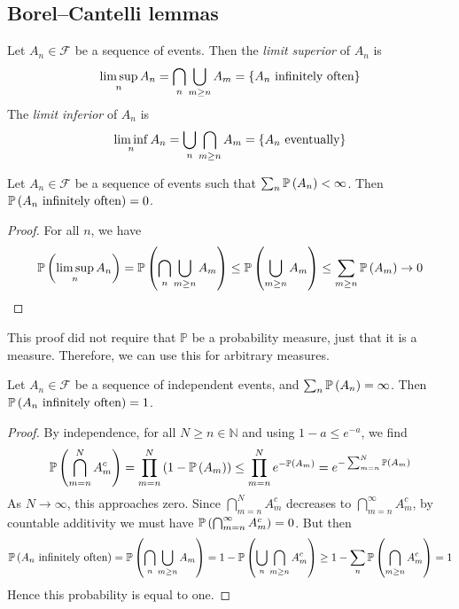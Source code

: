 \subsection{Borel--Cantelli lemmas}
\begin{definition}
	Let \( A_n \in \mathcal F \) be a sequence of events.
	Then the \emph{limit superior} of \( A_n \) is
	\[ \limsup_n A_n = \bigcap_n \bigcup_{m \geq n} A_m = \qty{A_n \text{ infinitely often}} \]
	The \emph{limit inferior} of \( A_n \) is
	\[ \liminf_n A_n = \bigcup_n \bigcap_{m \geq n} A_m = \qty{A_n \text{ eventually}} \]
\end{definition}
\begin{lemma}
	Let \( A_n \in \mathcal F \) be a sequence of events such that \( \sum_n \mathbb{P}\left({A_n}\right) < \infty \).
	Then \( \mathbb{P}\left({A_n \text{ infinitely often}}\right) = 0 \).
\end{lemma}
\begin{proof}
	For all \( n \), we have
	\[ \mathbb{P}\left({\limsup_n A_n}\right) = \mathbb{P}\left({\bigcap_n \bigcup_{m \geq n} A_m}\right) \leq \mathbb{P}\left({\bigcup_{m \geq n} A_m}\right) \leq \sum_{m \geq n} \mathbb{P}\left({A_m}\right) \to 0 \]
\end{proof}
This proof did not require that \( \mathbb P \) be a probability measure, just that it is a measure.
Therefore, we can use this for arbitrary measures.
\begin{lemma}
	Let \( A_n \in \mathcal F \) be a sequence of independent events, and \( \sum_n \mathbb{P}\left({A_n}\right) = \infty \).
	Then \( \mathbb{P}\left({A_n \text{ infinitely often}}\right) = 1 \).
\end{lemma}
\begin{proof}
	By independence, for all \( N \geq n \in \mathbb N \) and using \( 1 - a \leq e^{-a} \), we find
	\[ \mathbb{P}\left({\bigcap_{m=n}^N A_m^c}\right) = \prod_{m=n}^N \qty(1 - \mathbb{P}\left({A_m}\right)) \leq \prod_{m=n}^N e^{-\mathbb{P}\left({A_m}\right)} = e^{-\sum_{m=n}^N \mathbb{P}\left({A_m}\right)} \]
	As \( N \to \infty \), this approaches zero.
	Since \( \bigcap_{m=n}^N A_m^c \) decreases to \( \bigcap_{m=n}^\infty A_m^c \), by countable additivity we must have \( \mathbb{P}\left({\bigcap_{m=n}^\infty A_m^c}\right) = 0 \).
	But then
	\[ \mathbb{P}\left({A_n \text{ infinitely often}}\right) = \mathbb{P}\left({\bigcap_n \bigcup_{m \geq n} A_m}\right) = 1 - \mathbb{P}\left({\bigcup_n \bigcap_{m \geq n} A_m^c}\right) \geq 1 - \sum_n \mathbb{P}\left({\bigcap_{m \geq n} A_m^c}\right) = 1 \]
	Hence this probability is equal to one.
\end{proof}
